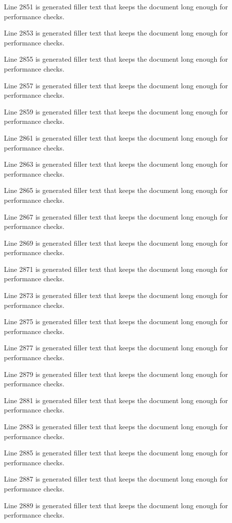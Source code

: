 Line 2851 is generated filler text that keeps the document long enough for performance checks.

Line 2853 is generated filler text that keeps the document long enough for performance checks.

Line 2855 is generated filler text that keeps the document long enough for performance checks.

Line 2857 is generated filler text that keeps the document long enough for performance checks.

Line 2859 is generated filler text that keeps the document long enough for performance checks.

Line 2861 is generated filler text that keeps the document long enough for performance checks.

Line 2863 is generated filler text that keeps the document long enough for performance checks.

Line 2865 is generated filler text that keeps the document long enough for performance checks.

Line 2867 is generated filler text that keeps the document long enough for performance checks.

Line 2869 is generated filler text that keeps the document long enough for performance checks.

Line 2871 is generated filler text that keeps the document long enough for performance checks.

Line 2873 is generated filler text that keeps the document long enough for performance checks.

Line 2875 is generated filler text that keeps the document long enough for performance checks.

Line 2877 is generated filler text that keeps the document long enough for performance checks.

Line 2879 is generated filler text that keeps the document long enough for performance checks.

Line 2881 is generated filler text that keeps the document long enough for performance checks.

Line 2883 is generated filler text that keeps the document long enough for performance checks.

Line 2885 is generated filler text that keeps the document long enough for performance checks.

Line 2887 is generated filler text that keeps the document long enough for performance checks.

Line 2889 is generated filler text that keeps the document long enough for performance checks.

